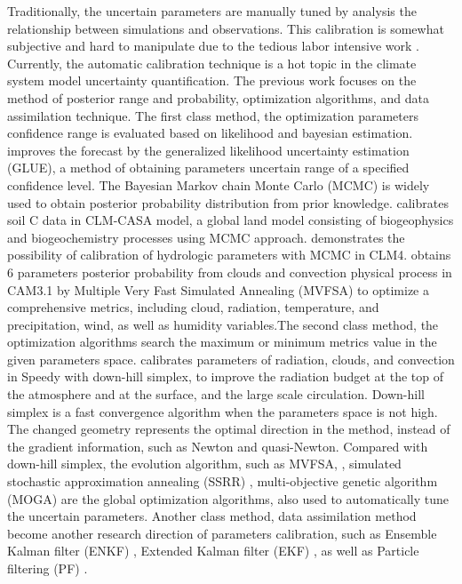 \documentclass[gmd, manuscript]{copernicus}
\begin{document}
Traditionally, the uncertain parameters are manually tuned by analysis the relationship between
simulations and observations. This calibration is somewhat subjective and hard to manipulate due to
the tedious labor intensive work \citep{hakkarainen2012closure,allen2000quantifying}. Currently,
the automatic calibration technique is a hot topic in the climate system model uncertainty
quantification. The previous work focuses on the method of posterior range and probability,
optimization algorithms, and data assimilation technique. The first class method, the optimization
parameters confidence range is evaluated based on likelihood and bayesian estimation.
\cite{cameron1999flood} improves the forecast by the generalized likelihood uncertainty estimation
(GLUE), a method of obtaining parameters uncertain range of a specified confidence level. The
Bayesian Markov chain Monte Carlo (MCMC) is widely used to obtain posterior probability
distribution from prior knowledge. \cite{hararuk2014evaluation} calibrates soil C data in CLM-CASA
model, a global land model consisting of biogeophysics and biogeochemistry processes using MCMC
approach. \cite{sun2013inverse} demonstrates the possibility of calibration of hydrologic 
parameters with  MCMC in CLM4. \cite{jackson2008error} obtains 6 parameters posterior probability 
from clouds and convection physical process in CAM3.1 by Multiple Very Fast  Simulated Annealing 
(MVFSA) to optimize a comprehensive metrics, including  cloud, radiation, temperature,  and
precipitation, wind, as  well as humidity variables.The second class method, the optimization
algorithms search the maximum or minimum metrics value in the given parameters
space.\cite{severijns2005optimizing} calibrates parameters of radiation,  clouds, and convection in
Speedy with down-hill simplex, to improve the radiation budget at the top of the atmosphere and at
the surface, and the  large scale circulation. Down-hill simplex is a fast convergence algorithm
when the parameters space is not high. The changed geometry represents the optimal direction in 
the method, instead of the gradient information, such as Newton and quasi-Newton.  Compared with 
down-hill simplex, the evolution algorithm,
such as MVFSA, \citep{jackson2004efficient,yang2014calibration}, simulated stochastic approximation
annealing (SSRR) \citep{yang2013uncertainty}, multi-objective genetic algorithm (MOGA)
\citep{swileruncertainty} are the global optimization algorithms, also used to automatically tune
the uncertain parameters. 
\cite{gill2006multiobjective}
Another class method, data assimilation method become another research
direction of parameters calibration, such as Ensemble Kalman filter (ENKF)
\citep{aksoy2006ensemble,delsole2010state}, Extended Kalman filter (EKF) \citep{carrassi2011state},
as well as Particle filtering (PF) \citep{snyder2008obstacles}.
\end{document}
